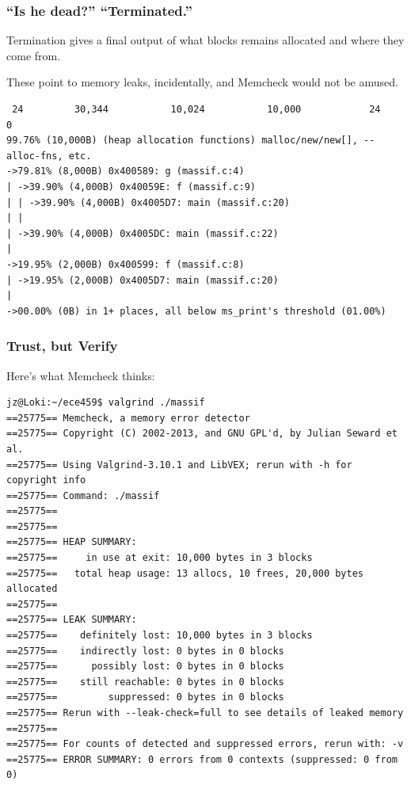 \begin{frame}[fragile]
\frametitle{``Is he dead?'' ``Terminated.''}

\large
\begin{changemargin}{2cm}
Termination gives a final output of what blocks remains allocated and where they come from. 

These point to memory leaks, incidentally, and Memcheck would not be amused.
\end{changemargin}
{\scriptsize
\begin{verbatim}
 24         30,344           10,024           10,000            24            0
99.76% (10,000B) (heap allocation functions) malloc/new/new[], --alloc-fns, etc.
->79.81% (8,000B) 0x400589: g (massif.c:4)
| ->39.90% (4,000B) 0x40059E: f (massif.c:9)
| | ->39.90% (4,000B) 0x4005D7: main (massif.c:20)
| |   
| ->39.90% (4,000B) 0x4005DC: main (massif.c:22)
|   
->19.95% (2,000B) 0x400599: f (massif.c:8)
| ->19.95% (2,000B) 0x4005D7: main (massif.c:20)
|   
->00.00% (0B) in 1+ places, all below ms_print's threshold (01.00%)
\end{verbatim}
}


\end{frame}


\begin{frame}[fragile]
\frametitle{Trust, but Verify}

\large
\begin{changemargin}{2cm}
Here's what Memcheck thinks:
\end{changemargin}

{\scriptsize
\begin{verbatim}
jz@Loki:~/ece459$ valgrind ./massif
==25775== Memcheck, a memory error detector
==25775== Copyright (C) 2002-2013, and GNU GPL'd, by Julian Seward et al.
==25775== Using Valgrind-3.10.1 and LibVEX; rerun with -h for copyright info
==25775== Command: ./massif
==25775== 
==25775== 
==25775== HEAP SUMMARY:
==25775==     in use at exit: 10,000 bytes in 3 blocks
==25775==   total heap usage: 13 allocs, 10 frees, 20,000 bytes allocated
==25775== 
==25775== LEAK SUMMARY:
==25775==    definitely lost: 10,000 bytes in 3 blocks
==25775==    indirectly lost: 0 bytes in 0 blocks
==25775==      possibly lost: 0 bytes in 0 blocks
==25775==    still reachable: 0 bytes in 0 blocks
==25775==         suppressed: 0 bytes in 0 blocks
==25775== Rerun with --leak-check=full to see details of leaked memory
==25775== 
==25775== For counts of detected and suppressed errors, rerun with: -v
==25775== ERROR SUMMARY: 0 errors from 0 contexts (suppressed: 0 from 0)
\end{verbatim}
}


\end{frame}


